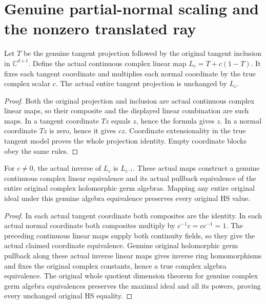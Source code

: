 \section{Genuine partial-normal scaling and the nonzero translated ray}

\begin{definition}
\label{hir:actual-normal-scaling-linear-map}
\leanok
Let $T$ be the genuine tangent projection followed by the original
tangent inclusion in $\mathbb C^{d+t}$. Define the actual continuous
complex linear map $L_c=T+c(1-T)$. It fixes each tangent coordinate and
multiplies each normal coordinate by the true complex scalar $c$.
The actual entire tangent projection is unchanged by $L_c$.
\end{definition}
\begin{proof}
Both the original projection and inclusion are actual continuous complex
linear maps, so their composite and the displayed linear combination
are such maps. In a tangent coordinate $Tz$ equals $z$, hence the
formula gives $z$. In a normal coordinate $Tz$ is zero, hence it gives
$cz$. Coordinate extensionality in the true tangent model proves the
whole projection identity. Empty coordinate blocks obey the same rules.
\end{proof}

\begin{definition}
\label{hir:actual-normal-scaling-whole-germ-equivalence}
\leanok
For $c\ne0$, the actual inverse of $L_c$ is $L_{c^{-1}}$. These actual
maps construct a genuine continuous complex linear equivalence and its
actual pullback equivalence of the entire original complex holomorphic
germ algebras. Mapping any entire original ideal under this genuine
algebra equivalence preserves every original HS value.
\end{definition}
\begin{proof}
In each actual tangent coordinate both composites are the identity.
In each actual normal coordinate both composites multiply by
$c^{-1}c=cc^{-1}=1$. The preceding continuous linear maps supply both
continuity fields, so they give the actual claimed coordinate
equivalence. Genuine original holomorphic germ pullback along these
actual inverse linear maps gives inverse ring homomorphisms and fixes
the original complex constants, hence a true complex algebra
equivalence. The original whole quotient dimension theorem for genuine
complex germ algebra equivalences preserves the maximal ideal and all
its powers, proving every unchanged original HS equality.
\end{proof}

